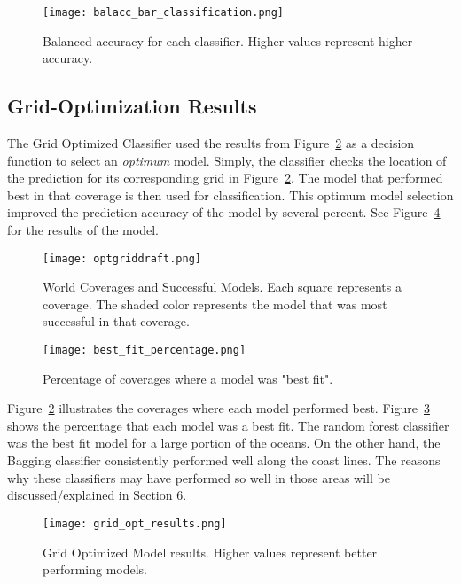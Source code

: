 \begin{figure}[htp]
    \centering
    \texttt{[image: balacc\_bar\_classification.png]}
    \caption{Balanced accuracy for each classifier. Higher values represent higher accuracy.}
    \label{fig:balacc_barplot_classification}
\end{figure}

\subsection{Grid-Optimization Results}
The Grid Optimized Classifier used the results from Figure~\ref{fig:coveragegrid} as a decision function to select an \textit{optimum} model.
Simply, the classifier checks the location of the prediction for its corresponding grid in Figure~\ref{fig:coveragegrid}.
The model that performed best in that coverage is then used for classification.
This optimum model selection improved the prediction accuracy of the model by several percent.
See Figure~\ref{fig:grid_opt_barplot} for the results of the model.



\newpage

\begin{figure}[htp]
    \centering
    \texttt{[image: optgriddraft.png]}
    \caption{World Coverages and Successful Models.
    Each square represents a coverage.
    The shaded color represents the model that was most successful in that coverage.}
    \label{fig:coveragegrid}
\end{figure}


\newpage
\begin{figure}[htp]
    \centering
    \texttt{[image: best\_fit\_percentage.png]}
    \caption{Percentage of coverages where a model was "best fit".}
    \label{fig:pie_best_fit}
\end{figure}

\par
Figure~\ref{fig:coveragegrid} illustrates the coverages where each model performed best.
Figure~\ref{fig:pie_best_fit} shows the percentage that each model was a best fit.
The random forest classifier was the best fit model for a large portion of the oceans.
On the other hand, the Bagging classifier consistently performed well along the coast lines.
The reasons why these classifiers may have performed so well in those areas will be discussed/explained in Section 6.

\newpage
\begin{figure}[htp]
    \centering
    \texttt{[image: grid\_opt\_results.png]}
    \caption{Grid Optimized Model results. Higher values represent better performing models.}
    \label{fig:grid_opt_barplot}
\end{figure}

